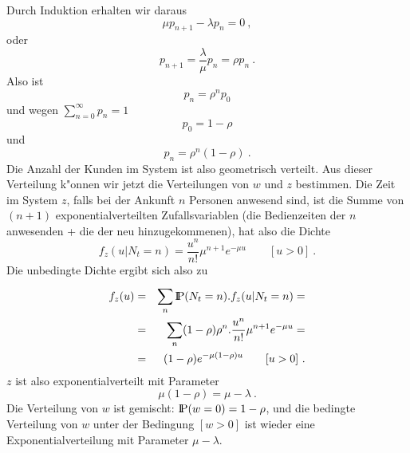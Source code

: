 Durch Induktion erhalten wir daraus
\begin{displaymath}
\mu p_{n+1} - \lambda p_{n} = 0 ~, 
\end{displaymath}
oder
\begin{displaymath}
p_{n+1} = \frac{\lambda}{\mu} p_{n} = \rho p_{n} ~. 
\end{displaymath}
Also ist
\begin{displaymath}
p_{n} = \rho^{n}p_{0} 
\end{displaymath}
und wegen $\sum_{n=0}^{\infty} p_{n} = 1$
\begin{displaymath} 
p_{0} = 1- \rho  
\end{displaymath}
und
\begin{displaymath}
p_{n} = \rho^{n} (1- \rho) ~.
\end{displaymath}
Die Anzahl der Kunden im System ist also geometrisch verteilt. Aus dieser
Verteilung k"onnen wir jetzt die Verteilungen von $w$ und $z$ bestimmen.
Die Zeit im System $z$, falls bei der Ankunft $n$ Personen anwesend sind,
ist die Summe von $(n+1)$ exponentialverteilten Zufallsvariablen (die
Bedienzeiten der $n$ anwesenden + die der neu hinzugekommenen), hat also
die Dichte
\begin{displaymath}
f_{z}(u|N_{t}=n) = \frac{u^{n}}{n!} \mu^{n+1} e^{- \mu u} \qquad [u>0] ~.
\end{displaymath}
Die unbedingte Dichte ergibt sich also zu
\begin{eqnarray*}
f_{z}(u) &=& \sum_{n}^{} {\rm I\kern-0.2em P}(N_{t}=n).f_{z}(u|N_{t}=n) = \\
 &=& \sum_{n}^{} (1- \rho) \rho^{n}. \frac{u^{n}}{n!} \mu^{n+1} e^{- \mu
u} = \\
 &=& (1- \rho) e^{- \mu(1- \rho)u} \qquad [u>0] ~.
\end{eqnarray*}
$z$ ist also exponentialverteilt mit Parameter
\begin{displaymath}
\mu (1- \rho) = \mu - \lambda ~.
\end{displaymath}
Die Verteilung von $w$ ist gemischt: ${\rm I\kern-0.2em P} (w=0) = 1- \rho$, und die
bedingte Verteilung von $w$ unter der Bedingung $[w>0]$ ist wieder eine
Exponentialverteilung mit Parameter $\mu - \lambda$.

